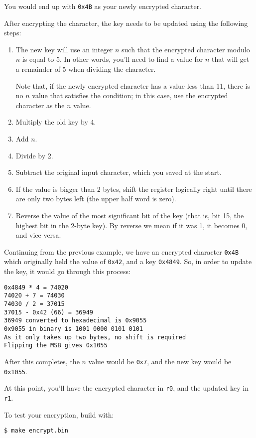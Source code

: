 \documentclass{article}
\def\r#1{\texttt{r#1}}
\begin{document}
You would end up with {\tt 0x4B} as your newly encrypted character.\newline


After encrypting the character, the key needs to be updated using the 
following steps:

\begin{enumerate} \item The new key will use an integer $n$ such that the 
encrypted character modulo $n$ is equal to 5. In other words, you'll need 
to find a value for $n$ that will get a remainder of 5 when dividing the
character.

Note that, if the newly encrypted character has a value less than 11, there
is no $n$ value that satisfies the condition; in this case, use the encrypted
character as the $n$ value.
\item Multiply the old key by 4.
\item Add $n$.
\item Divide by 2.
\item Subtract the original input character, which you saved at the start.
\item If the value is bigger than 2 bytes, shift the register logically 
right until there are only two bytes left (the upper half word is zero).
\item Reverse the value of the most significant bit of the key (that is, bit
15, the highest bit in the 2-byte key). By reverse we mean if it was 1, it becomes 
0, and vice versa.
\end{enumerate}

Continuing from the previous example, we have an encrypted character 
{\tt 0x4B} which originally held the value of {\tt 0x42}, and a key 
{\tt 0x4849}. So, in order to update the key, it would go through this 
process:
\begin{verbatim}
0x4849 * 4 = 74020
74020 + 7 = 74030
74030 / 2 = 37015
37015 - 0x42 (66) = 36949
36949 converted to hexadecimal is 0x9055
0x9055 in binary is 1001 0000 0101 0101
As it only takes up two bytes, no shift is required
Flipping the MSB gives 0x1055
\end{verbatim}

After this completes, the $n$ value would be {\tt 0x7}, and the new key 
would be {\tt 0x1055}.


At this point, you'll have the encrypted character in \r{0}, and the updated
key in \r{1}.

To test your encryption, build with:

\begin{verbatim}
$ make encrypt.bin
\end{verbatim}
\end{document}
